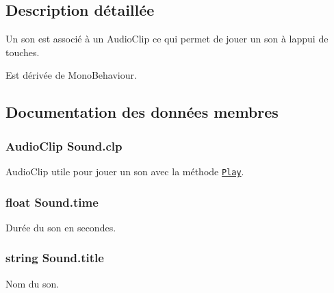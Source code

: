\subsection{Description détaillée}
Un son est associé à un Audio\+Clip ce qui permet de jouer un son à l\textquotesingle{}appui de touches. 

Est dérivée de Mono\+Behaviour.



\subsection{Documentation des données membres}
\hypertarget{class_sound_ab3aef1528cd38ad28e2f9843d56afbbe}{}
\subsubsection[{clp}]{\setlength{\rightskip}{0pt plus 5cm}Audio\+Clip Sound.\+clp\hspace{0.3cm}{\ttfamily [private]}}\label{class_sound_ab3aef1528cd38ad28e2f9843d56afbbe}


Audio\+Clip utile pour jouer un son avec la méthode \href{http://docs.unity3d.com/ScriptReference/AudioSource.Play.html}{\tt Play}. 

\hypertarget{class_sound_a2b67e874a75d0d390d37cdbaa2f51087}{}
\subsubsection[{time}]{\setlength{\rightskip}{0pt plus 5cm}float Sound.\+time\hspace{0.3cm}{\ttfamily [private]}}\label{class_sound_a2b67e874a75d0d390d37cdbaa2f51087}


Durée du son en secondes. 

\hypertarget{class_sound_a17853cdf74f081a79ba4e658c6e25a13}{}
\subsubsection[{title}]{\setlength{\rightskip}{0pt plus 5cm}string Sound.\+title\hspace{0.3cm}{\ttfamily [private]}}\label{class_sound_a17853cdf74f081a79ba4e658c6e25a13}


Nom du son. 



